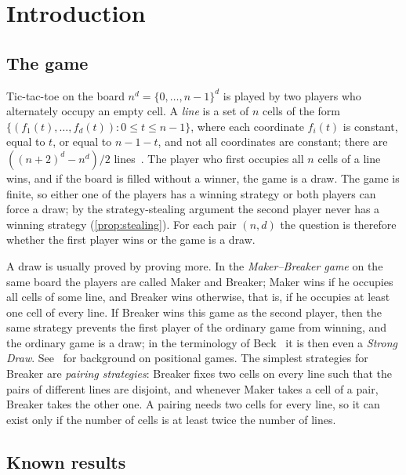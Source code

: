 \section{Introduction}\label{sec:intro}

\subsection{The game}\label{ssec:intro-game}

Tic-tac-toe on the board $n^d=\{0,\dots,n-1\}^d$ is played by two players who alternately occupy an
empty cell. A \emph{line} is a set of $n$ cells of the form $\{(f_1(t),\dots,f_d(t)) : 0\le t\le n-1\}$,
where each coordinate $f_i(t)$ is constant, equal to $t$, or equal to $n-1-t$, and not all coordinates
are constant; there are $((n+2)^d-n^d)/2$ lines~\cite[Theorem~1]{GolombHales2002}. The player who first
occupies all $n$ cells of a line wins, and if the board is filled without a winner, the game is a draw.
The game is finite, so either one of the players has a winning strategy or both players can force a
draw; by the strategy-stealing argument the second player never has a winning strategy
(\cref{prop:stealing}). For each pair $(n,d)$ the question is therefore whether the first player wins
or the game is a draw.

A draw is usually proved by proving more. In the \emph{Maker--Breaker game} on the same board the
players are called Maker and Breaker; Maker wins if he occupies all cells of some line, and Breaker wins
otherwise, that is, if he occupies at least one cell of every line. If Breaker wins this game as the
second player, then the same strategy prevents the first player of the ordinary game from winning, and
the ordinary game is a draw; in the terminology of Beck~\cite{Beck2008} it is then even a \emph{Strong
Draw}. See~\cite{Beck2008,HefetzKrivelevichStojakovicSzabo2014,Krivelevich2014} for background on
positional games. The simplest strategies for Breaker are \emph{pairing strategies}: Breaker fixes two
cells on every line such that the pairs of different lines are disjoint, and whenever Maker takes a
cell of a pair, Breaker takes the other one. A pairing needs two cells for every line, so it can exist
only if the number of cells is at least twice the number of lines.

\subsection{Known results}\label{ssec:intro-known}

